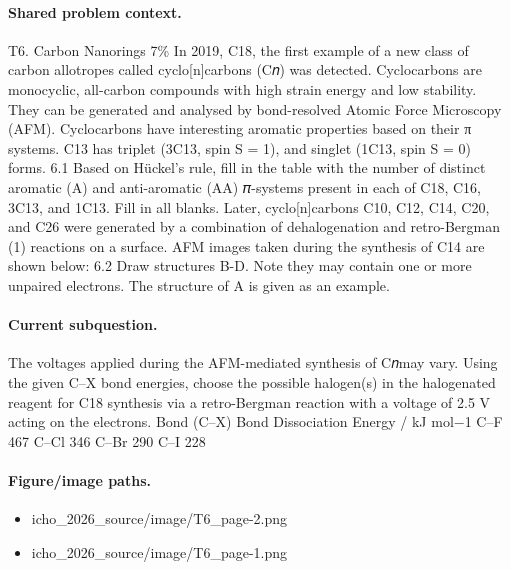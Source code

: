 \paragraph{Shared problem context.}
T6. Carbon Nanorings 7\% In 2019, C18, the first example of a new class of carbon allotropes called cyclo[n]carbons (C𝑛) was detected. Cyclocarbons are monocyclic, all-carbon compounds with high strain energy and low stability. They can be generated and analysed by bond-resolved Atomic Force Microscopy (AFM). Cyclocarbons have interesting aromatic properties based on their π systems. C13 has triplet (3C13, spin S = 1), and singlet (1C13, spin S = 0) forms. 6.1 Based on Hückel’s rule, fill in the table with the number of distinct aromatic (A) and anti-aromatic (AA) 𝜋-systems present in each of C18, C16, 3C13, and 1C13. Fill in all blanks. Later, cyclo[n]carbons C10, C12, C14, C20, and C26 were generated by a combination of dehalogenation and retro-Bergman (1) reactions on a surface. AFM images taken during the synthesis of C14 are shown below: 6.2 Draw structures B-D. Note they may contain one or more unpaired electrons. The structure of A is given as an example.

\paragraph{Current subquestion.}
The voltages applied during the AFM-mediated synthesis of C𝑛may vary. Using the given C–X bond energies, choose the possible halogen(s) in the halogenated reagent for C18 synthesis via a retro-Bergman reaction with a voltage of 2.5 V acting on the electrons. Bond (C–X) Bond Dissociation Energy / kJ mol−1 C–F 467 C–Cl 346 C–Br 290 C–I 228

\paragraph{Figure/image paths.}
\begin{itemize}
\item icho\_2026\_source/image/T6\_page-2.png
\item icho\_2026\_source/image/T6\_page-1.png
\end{itemize}

